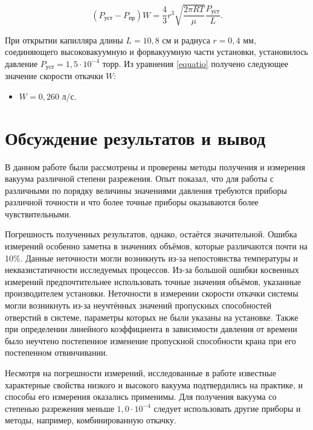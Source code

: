 \documentclass[a4paper,12pt]{article} %
\begin{document}
\begin{equation}
    (P_\text{уст} - P_\text{пр})W = \frac{4}{3}r^3\sqrt{\frac{2\pi RT}{\mu}}\frac{P_\text{уст}}{L}.
    \label{equatio}
\end{equation}

При открытии капилляра длины $L = 10,8$ см и радиуса $r = 0,4$ мм, соединяющего высоковакуумную и форвакуумную части установки, установилось давление $P_\text{уст} = 1,5 \cdot 10^{-4}$ торр. Из уравнения \eqref{equatio} получено следующее значение скорости откачки $W$:

\begin{itemize}
    \item $W = 0,260 $ л/с.
\end{itemize}

\section{Обсуждение результатов и вывод}

В данном работе были рассмотрены и проверены методы получения и измерения вакуума различной степени разрежения. Опыт показал, что для работы с различными по порядку величины значениями давления требуются приборы различной точности и что более точные приборы оказываются более чувствительными. 

Погрешность полученных результатов, однако, остаётся значительной. Ошибка измерений особенно заметна в значениях объёмов, которые различаются почти на 10\%. Данные неточности могли возникнуть из-за непостоянства температуры и неквазистатичности исследуемых процессов. Из-за большой ошибки косвенных измерений предпочтительнее использовать точные значения объёмов, указанные производителем установки. 
Неточности в измерении скорости откачки системы могли возникнуть из-за неучтённых значений пропускных способностей отверстий в системе, параметры которых не были указаны на установке. Также при определении линейного коэффициента в зависимости давления от времени было неучтено постепенное изменение пропускной способности крана при его постепенном отвинчивании.

Несмотря на погрешности измерений, исследованные в работе известные характерные свойства низкого и высокого вакуума подтвердились на практике, и способы его измерения оказались применимы. Для получения вакуума со степенью разрежения меньше $1,0 \cdot 10^{-4}$ следует использовать другие приборы и методы, например, комбинированную откачку.  
\end{document}
